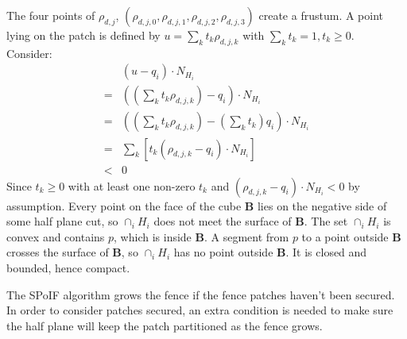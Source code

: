 \documentclass[a4paper,fleqn]{cas-dc}
\begin{document}
\begin{pf}
  The four points of $\rho _ {d,j}$, $(\rho _ {d,j,0},\rho _ {d,j,1},\rho _ {d,j,2},\rho _ {d,j,3})$  create a frustum.
  A point lying on the patch is defined by $u = \sum _ k t _ k \rho _ {d,j,k}$ with $\sum _ k t _k = 1, t _k \ge 0$. \\
  Consider:\\
  $$
  \begin{array}{ll}
   & ( u - q _ i ) \cdot N _ {H _ i}  \\
    = & ( (\sum _ k t _ k \rho _ {d,j,k} ) - q _ i ) \cdot N _ {H _ i} \\
    = & ( (\sum _ k t _ k \rho _ {d,j,k} ) - (\sum _ k t _ k ) q _ i ) \cdot N _ {H _ i} \\
    = & \sum _ k [ t _ k ( \rho _ {d,j,k} - q _ i ) \cdot N _ {H _ i} ] \\
    < & 0
  \end{array}
  $$
  Since $t _ k \ge 0$ with at least one non-zero $t _ k$ and $(\rho _ {d,j,k} - q_i) \cdot N _ {H _ i} < 0$ by assumption.
  Every point on the face of the cube $\mathbf{B}$ lies on the negative side of some half plane cut,
  so $\cap _ i H _ i$ does not meet the surface of $\mathbf{B}$.
  The set $\cap _ i H _ i$ is convex and contains $p$, which is inside $\mathbf{B}$.
  A segment from $p$ to a point outside $\mathbf{B}$ crosses the surface of $\mathbf{B}$,
  so $\cap _ i H _ i$ has no point outside $\mathbf{B}$.
  It is closed and bounded, hence compact.
\end{pf}

The SPoIF algorithm grows the fence if the fence patches haven't been secured.
In order to consider patches secured, an extra condition is needed to make sure the half plane will
keep the patch partitioned as the fence grows.
\end{document}
